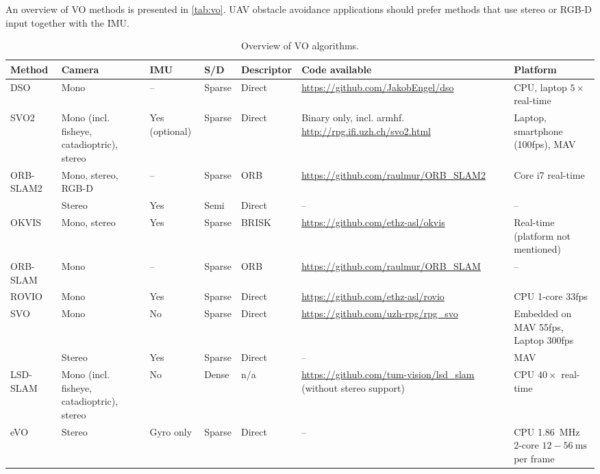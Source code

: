 An overview of \ac{VO} methods is presented in \autoref{tab:vo}.
\ac{UAV} obstacle avoidance applications should prefer methods that use stereo or RGB-D input together with the \ac{IMU}.

\begin{sidewaystable}
\centering
\hspace{-3cm}
\caption{Overview of \ac{VO} algorithms.}
\label{tab:vo}
\begin{tabular}{lp{3cm}lllp{5cm}p{5cm}}
\toprule
\textbf{Method} & \textbf{Camera} & \textbf{IMU} & \textbf{S/D} & \textbf{Descriptor} & \textbf{Code available} & \textbf{Platform} \\
\midrule
DSO \cite{Engel2017} & Mono & -- & Sparse & Direct & \url{https://github.com/JakobEngel/dso} & CPU, laptop $5\times$ real-time \\
SVO2 \cite{Forster2017} & Mono (incl. fisheye, catadioptric), stereo & Yes (optional) & Sparse & Direct & Binary only, incl. armhf. \url{http://rpg.ifi.uzh.ch/svo2.html} & Laptop, smartphone (100fps), \acs{MAV} \\
ORB-SLAM2 \cite{Mur-Artal2017} & Mono, stereo, RGB-D & -- & Sparse & ORB & \url{https://github.com/raulmur/ORB_SLAM2} & Core i7 real-time \\
\citeauthor{Usenko2016} \cite{Usenko2016} & Stereo & Yes & Semi & Direct & -- & -- \\
OKVIS \cite{Leutenegger2015} & Mono, stereo & Yes & Sparse & BRISK & \url{https://github.com/ethz-asl/okvis} & Real-time (platform not mentioned) \\
ORB-SLAM \cite{Mur-Artal2015} & Mono & -- & Sparse & ORB & \url{https://github.com/raulmur/ORB_SLAM} & -- \\
ROVIO \cite{Bloesch2015} & Mono & Yes & Sparse & Direct & \url{https://github.com/ethz-asl/rovio} & CPU 1-core 33fps \\
SVO \cite{Forster2014} & Mono & No & Sparse & Direct & \url{https://github.com/uzh-rpg/rpg_svo} & Embedded on MAV 55fps, Laptop 300fps \\
\citeauthor{Schmid2014} \cite{Schmid2014} & Stereo & Yes & Sparse & Direct & -- & \acs{MAV} \\
LSD-SLAM \cite{Engel2014,Engel2015} & Mono (incl. fisheye, catadioptric), stereo & No & Dense & n/a & \url{https://github.com/tum-vision/lsd_slam} (without stereo support) & CPU $40\times$ real-time \\
eVO \cite{Sanfourche2013} & Stereo & Gyro only & Sparse & Direct & -- & CPU \SI{1.86}{\mega\Hz} 2-core $12-\SI{56}{\milli\s}$ per frame \\

\end{tabular}
\end{sidewaystable}
